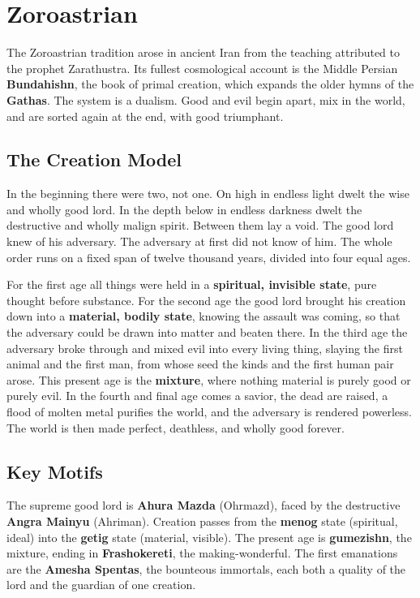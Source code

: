 \section{Zoroastrian}

The Zoroastrian tradition arose in ancient Iran from the teaching attributed to the prophet Zarathustra. Its fullest cosmological account is the Middle Persian \textbf{Bundahishn}, the book of primal creation, which expands the older hymns of the \textbf{Gathas}. The system is a dualism. Good and evil begin apart, mix in the world, and are sorted again at the end, with good triumphant.

\subsection{The Creation Model}

In the beginning there were two, not one. On high in endless light dwelt the wise and wholly good lord. In the depth below in endless darkness dwelt the destructive and wholly malign spirit. Between them lay a void. The good lord knew of his adversary. The adversary at first did not know of him. The whole order runs on a fixed span of twelve thousand years, divided into four equal ages.

For the first age all things were held in a \textbf{spiritual, invisible state}, pure thought before substance. For the second age the good lord brought his creation down into a \textbf{material, bodily state}, knowing the assault was coming, so that the adversary could be drawn into matter and beaten there. In the third age the adversary broke through and mixed evil into every living thing, slaying the first animal and the first man, from whose seed the kinds and the first human pair arose. This present age is the \textbf{mixture}, where nothing material is purely good or purely evil. In the fourth and final age comes a savior, the dead are raised, a flood of molten metal purifies the world, and the adversary is rendered powerless. The world is then made perfect, deathless, and wholly good forever.

\subsection{Key Motifs}

The supreme good lord is \textbf{Ahura Mazda} (Ohrmazd), faced by the destructive \textbf{Angra Mainyu} (Ahriman). Creation passes from the \textbf{menog} state (spiritual, ideal) into the \textbf{getig} state (material, visible). The present age is \textbf{gumezishn}, the mixture, ending in \textbf{Frashokereti}, the making-wonderful. The first emanations are the \textbf{Amesha Spentas}, the bounteous immortals, each both a quality of the lord and the guardian of one creation.


